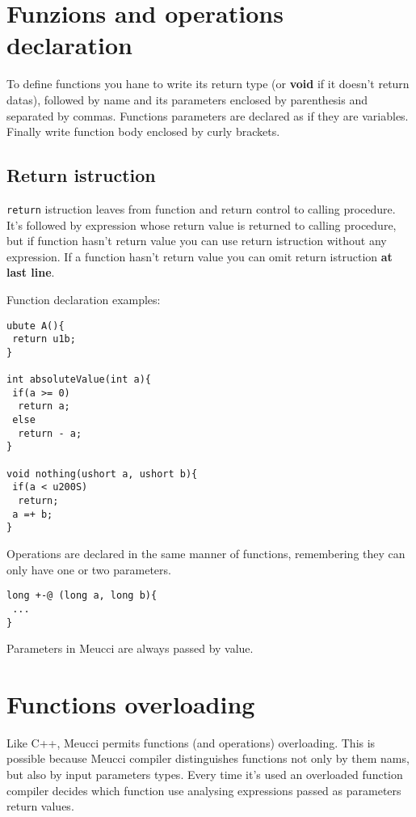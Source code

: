 \documentclass[10pt]{book}%
\newcommand{\code}[1]{\texttt{#1}}
\renewcommand{\emph}[1]{\textbf{#1}}
\newenvironment{codeenv}{
\begin{mdframed}[backgroundcolor=black!20,topline=false,leftline=false,rightline=false,bottomline=false]
}
{\end{mdframed}}
\begin{document}
\section{Funzions and operations declaration}
To define functions you hane to write its return type (or \emph{void} if it doesn't return datas), followed by name and its parameters enclosed by parenthesis and separated by commas. Functions parameters are declared as if they are variables. Finally write function body enclosed by curly brackets.

\subsection{Return istruction}
\code{return} istruction leaves from function and return control to calling procedure. It's followed by expression whose return value is returned to calling procedure, but if function hasn't return value you can use return istruction without any expression. If a function hasn't return value you can omit return istruction \emph{at last line}.

Function declaration examples:
\begin{codeenv}
\begin{verbatim}
ubute A(){
 return u1b;
}

int absoluteValue(int a){
 if(a >= 0)
  return a;
 else
  return - a;
}

void nothing(ushort a, ushort b){
 if(a < u200S)
  return;
 a =+ b;
}
\end{verbatim}
\end{codeenv}

Operations are declared in the same manner of functions, remembering they can only have one or two parameters.
\begin{codeenv}
\begin{verbatim}
long +-@ (long a, long b){
 ...
}
\end{verbatim}
\end{codeenv}

Parameters in Meucci are always passed by value.

\section{Functions overloading}
Like C++, Meucci permits functions (and operations) overloading. This is possible because Meucci compiler distinguishes functions not only by them nams, but also by input parameters types. Every time it's used an overloaded function compiler decides which function use analysing expressions passed as parameters return values.
\end{document}
